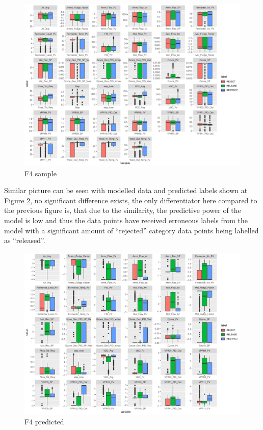 \begin{figure}[ht!]
    \centering
    \includegraphics[width=1.0\textwidth]{plots/f4-sample.pdf}
    \caption{F4 sample}
    \label{fig:f4_sample}
\end{figure}

Similar picture can be seen with modelled data and predicted labels shown at Figure \ref{fig:f4_predicted}, no significant difference exists, the only differentiator here compared to the previous figure is, that due to the similarity, the predictive power of the model is low and thus the data points have received erroneous labels from the model with a significant amount of ``rejected'' category data points being labelled as ``released''.

\begin{figure}[ht!]
    \centering
    \includegraphics[width=1.0\textwidth]{plots/f4-predicted.pdf}
    \caption{F4 predicted}
    \label{fig:f4_predicted}
\end{figure}


